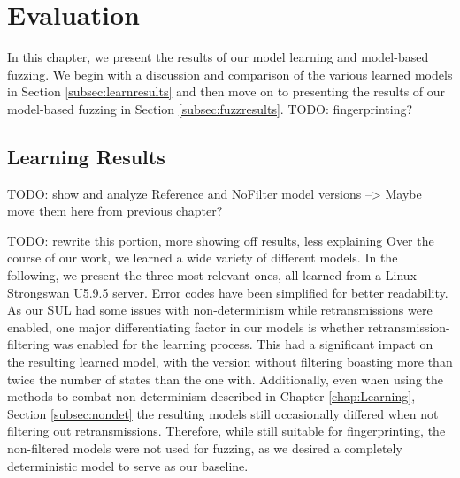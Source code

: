 %
%
% 
% 
% 

\chapter{Evaluation} \label{chap:Evaluation}

In this chapter, we present the results of our model learning and model-based fuzzing. We begin with a discussion and comparison of the various learned models in Section \ref{subsec:learnresults} and then move on to presenting the results of our model-based fuzzing in Section \ref{subsec:fuzzresults}. TODO: fingerprinting?



\section{Learning Results} \label{sec:learnresults}
TODO: show and analyze Reference and NoFilter model versions --> Maybe move them here from previous chapter?

TODO: rewrite this portion, more showing off results, less explaining
Over the course of our work, we learned a wide variety of different models. In the following, we present the three most relevant ones, all learned from a Linux Strongswan U5.9.5 server. Error codes have been simplified for better readability. As our SUL had some issues with non-determinism while retransmissions were enabled, one major differentiating factor in our models is whether retransmission-filtering was enabled for the learning process. This had a significant impact on the resulting learned model, with the version without filtering boasting more than twice the number of states than the one with. Additionally, even when using the methods to combat non-determinism described in Chapter \ref{chap:Learning}, Section \ref{subsec:nondet} the resulting models still occasionally differed when not filtering out retransmissions. Therefore, while still suitable for fingerprinting, the non-filtered models were not used for fuzzing, as we desired a completely deterministic model to serve as our baseline.

